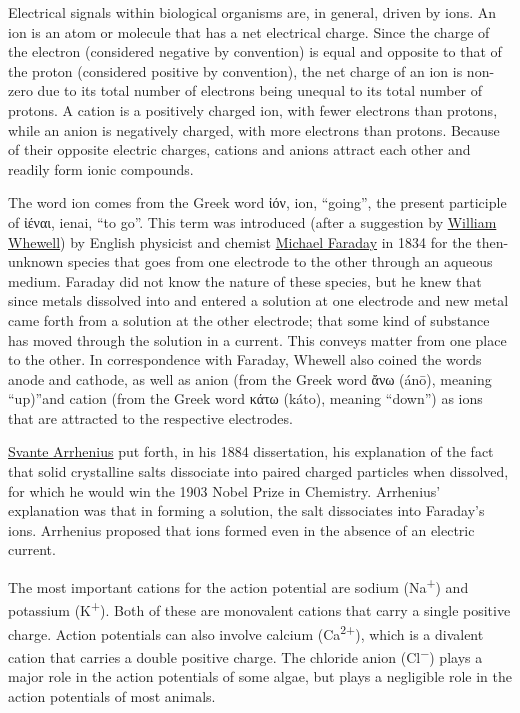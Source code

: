 Electrical signals within biological organisms are, in general, driven by ions. An ion is an atom or molecule that has a net electrical charge. Since the charge of the electron (considered negative by convention) is equal and opposite to that of the proton (considered positive by convention), the net charge of an ion is non-zero due to its total number of electrons being unequal to its total number of protons. A cation is a positively charged ion, with fewer electrons than protons, while an anion is negatively charged, with more electrons than protons. Because of their opposite electric charges, cations and anions attract each other and readily form ionic compounds.

The word ion comes from the Greek word ἰόν, ion, ``going'', the present participle of ἰέναι, ienai, ``to go''. This term was introduced (after a suggestion by \href{https://en.wikipedia.org/wiki/William_Whewell}{William Whewell}) by English physicist and chemist \href{https://en.wikipedia.org/wiki/Michael_Faraday}{Michael Faraday} in 1834 for the then-unknown species that goes from one electrode to the other through an aqueous medium. Faraday did not know the nature of these species, but he knew that since metals dissolved into and entered a solution at one electrode and new metal came forth from a solution at the other electrode; that some kind of substance has moved through the solution in a current. This conveys matter from one place to the other. In correspondence with Faraday, Whewell also coined the words anode and cathode, as well as anion (from the Greek word ἄνω (ánō), meaning ``up)''and cation (from the Greek word κάτω (káto), meaning ``down'') as ions that are attracted to the respective electrodes.

\href{https://en.wikipedia.org/wiki/Svante_Arrhenius}{Svante Arrhenius} put forth, in his 1884 dissertation, his explanation of the fact that solid crystalline salts dissociate into paired charged particles when dissolved, for which he would win the 1903 Nobel Prize in Chemistry. Arrhenius' explanation was that in forming a solution, the salt dissociates into Faraday's ions. Arrhenius proposed that ions formed even in the absence of an electric current.

The most important cations for the action potential are sodium (Na\textsuperscript{+}) and potassium (K\textsuperscript{+}). Both of these are monovalent cations that carry a single positive charge. Action potentials can also involve calcium (Ca\textsuperscript{2+}), which is a divalent cation that carries a double positive charge. The chloride anion (Cl\textsuperscript{−}) plays a major role in the action potentials of some algae, but plays a negligible role in the action potentials of most animals.



